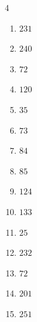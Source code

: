 \begin{multicols}{4}
\begin{enumerate}

  \item $231$


  \item $240$


  \item $72$


  \item $120$


\columnbreak %

\resetques

  \item $35$


  \item $73$


  \item $84$


  \item $85$


  \item $124$


  \item $133$


  \item $25$


  \item $232$


  \item $72$


  \item $201$


  \item $251$


\end{enumerate}
\end{multicols}
